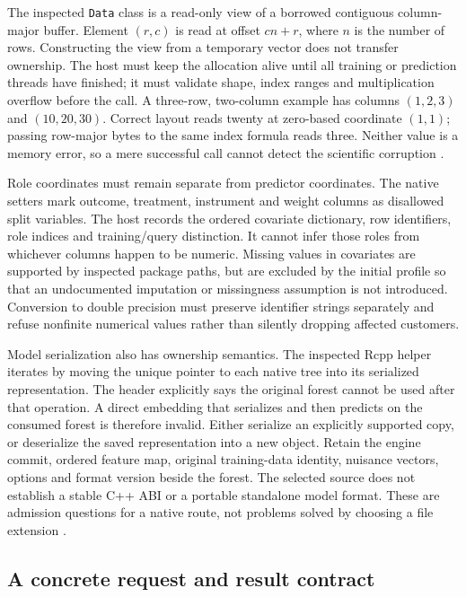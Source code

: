 The inspected \texttt{Data} class is a read-only view of a borrowed
contiguous column-major buffer. Element \((r,c)\) is read at offset
\(cn+r\), where \(n\) is the number of rows. Constructing the view from
a temporary vector does not transfer ownership. The host must keep the
allocation alive until all training or prediction threads have finished;
it must validate shape, index ranges and multiplication overflow before
the call. A three-row, two-column example has columns \((1,2,3)\) and
\((10,20,30)\). Correct layout reads twenty at zero-based coordinate
\((1,1)\); passing row-major bytes to the same index formula reads
three. Neither value is a memory error, so a mere successful call cannot
detect the scientific corruption
\cite{exec13_grf_memory,exec13_grf_oracle}.

Role coordinates must remain separate from predictor coordinates. The
native setters mark outcome, treatment, instrument and weight columns as
disallowed split variables. The host records the ordered covariate
dictionary, row identifiers, role indices and training/query
distinction. It cannot infer those roles from whichever columns happen
to be numeric. Missing values in covariates are supported by inspected
package paths, but are excluded by the initial profile so that an
undocumented imputation or missingness assumption is not introduced.
Conversion to double precision must preserve identifier strings
separately and refuse nonfinite numerical values rather than silently
dropping affected customers.

Model serialization also has ownership semantics. The inspected Rcpp
helper iterates by moving the unique pointer to each native tree into
its serialized representation. The header explicitly says the original
forest cannot be used after that operation. A direct embedding that
serializes and then predicts on the consumed forest is therefore
invalid. Either serialize an explicitly supported copy, or deserialize
the saved representation into a new object. Retain the engine commit,
ordered feature map, original training-data identity, nuisance vectors,
options and format version beside the forest. The selected source does
not establish a stable C++ ABI or a portable standalone model format.
These are admission questions for a native route, not problems solved by
choosing a file extension \cite{exec13_grf_memory}.

\subsection{A concrete request and result contract}

